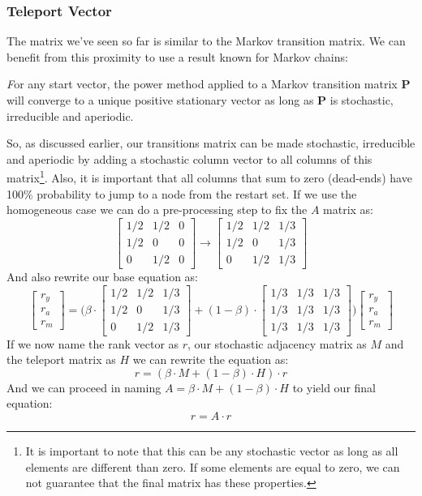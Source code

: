 \subsubsection{Teleport Vector}
The matrix we've seen so far is similar to the Markov transition matrix. We can benefit from this proximity to use a result known for Markov chains:
\begin{center}
\textit
For any start vector, the power method applied to a Markov transition matrix \textbf{P} will converge to a unique positive stationary vector as long as \textbf{P} is stochastic, irreducible and aperiodic.\cite{pakes1969markov}
\end{center}
So, as discussed earlier, our transitions matrix can be made stochastic, irreducible and aperiodic by adding a stochastic column vector to all columns of this matrix\footnote{It is important to note that this can be any stochastic vector as long as all elements are different than zero. If some elements are equal to zero, we can not guarantee that the final matrix has these properties.}. Also, it is important that all columns that sum to zero (dead-ends) have 100\% probability to jump to a node from the restart set. If we use the homogeneous case we can do a pre-processing step to fix the $A$ matrix as:
\[
\begin{bmatrix}
1/2 & 1/2 & 0 \\
1/2 & 0 & 0 \\
0 & 1/2 & 0
\end{bmatrix}
\rightarrow
\begin{bmatrix}
1/2 & 1/2 & 1/3 \\
1/2 & 0 & 1/3 \\
0 & 1/2 & 1/3
\end{bmatrix}
\]
And also rewrite our base equation as:
\[
\begin{bmatrix}
r_y \\
r_a \\
r_m
\end{bmatrix}
=
\Bigg(
\beta \cdot
\begin{bmatrix}
1/2 & 1/2 & 1/3 \\
1/2 & 0 & 1/3 \\
0 & 1/2 & 1/3
\end{bmatrix}
+
(1-\beta) \cdot
\begin{bmatrix}
1/3 & 1/3 & 1/3 \\
1/3 & 1/3 & 1/3 \\
1/3 & 1/3 & 1/3
\end{bmatrix}
\Bigg)
\begin{bmatrix}
r_y \\
r_a \\
r_m
\end{bmatrix}
\]
If we now name the rank vector as $r$, our stochastic adjacency matrix as $M$ and the teleport matrix as $H$ we can rewrite the equation as:
\[
r = (\beta \cdot M + (1-\beta) \cdot H) \cdot r
\]
And we can proceed in naming $A = \beta \cdot M + (1-\beta) \cdot H$ to yield our final equation:
$$r = A \cdot r$$

